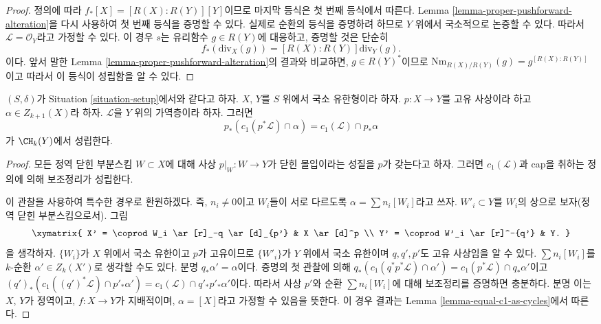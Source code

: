 \begin{proof}
정의에 따라 $f_*[X] = [R(X) : R(Y)][Y]$이므로 마지막 등식은 첫 번째
등식에서 따른다. Lemma \ref{lemma-proper-pushforward-alteration}을 다시
사용하여 첫 번째 등식을 증명할 수 있다. 실제로 순환의 등식을
증명하려 하므로 $Y$ 위에서 국소적으로 논증할 수 있다. 따라서
$\mathcal{L} = \mathcal{O}_Y$라고 가정할 수 있다. 이 경우 $s$는
유리함수 $g \in R(Y)$에 대응하고, 증명할 것은 단순히
$$
f_*\left(\text{div}_X(g)\right) =
[R(X) : R(Y)]\text{div}_Y(g).
$$
이다. 앞서 말한 Lemma \ref{lemma-proper-pushforward-alteration}의 결과와
비교하면, $g \in R(Y)^*$이므로
$\text{Nm}_{R(X)/R(Y)}(g) = g^{[R(X) : R(Y)]}$이고 따라서 이 등식이
성립함을 알 수 있다.
\end{proof}

\begin{lemma}
\label{lemma-pushforward-cap-c1}
$(S, \delta)$가 Situation \ref{situation-setup}에서와 같다고 하자.
$X$, $Y$를 $S$ 위에서 국소 유한형이라 하자. $p : X \to Y$를 고유
사상이라 하고 $\alpha \in Z_{k + 1}(X)$라 하자. $\mathcal{L}$을 $Y$ 위의
가역층이라 하자. 그러면
$$
p_*(c_1(p^*\mathcal{L}) \cap \alpha) = c_1(\mathcal{L}) \cap p_*\alpha
$$
가 $\CH_k(Y)$에서 성립한다.
\end{lemma}

\begin{proof}
모든 정역 닫힌 부분스킴 $W \subset X$에 대해 사상
$p|_W : W \to Y$가 닫힌 몰입이라는 성질을 $p$가 갖는다고 하자. 그러면
$c_1(\mathcal{L})$과 cap을 취하는 정의에 의해 보조정리가 성립한다.

\medskip\noindent
이 관찰을 사용하여 특수한 경우로 환원하겠다. 즉, $n_i \not = 0$이고
$W_i$들이 서로 다르도록 $\alpha = \sum n_i[W_i]$라고 쓰자.
$W'_i \subset Y$를 $W_i$의 상으로 보자(정역 닫힌 부분스킴으로서).
그림
$$
\xymatrix{
X' = \coprod W_i \ar[r]_-q \ar[d]_{p'} & X \ar[d]^p \\
Y' = \coprod W'_i \ar[r]^-{q'} & Y.
}
$$
을 생각하자. $\{W_i\}$가 $X$ 위에서 국소 유한이고 $p$가 고유이므로
$\{W'_i\}$가 $Y$ 위에서 국소 유한이며 $q, q', p'$도 고유 사상임을
알 수 있다. $\sum n_i[W_i]$를 $k$-순환
$\alpha' \in Z_k(X')$로 생각할 수도 있다. 분명
$q_*\alpha' = \alpha$이다. 증명의 첫 관찰에 의해
$q_*(c_1(q^*p^*\mathcal{L}) \cap \alpha')
= c_1(p^*\mathcal{L}) \cap q_*\alpha'$이고
$(q')_*(c_1((q')^*\mathcal{L}) \cap p'_*\alpha') =
c_1(\mathcal{L}) \cap q'_*p'_*\alpha'$이다. 따라서 사상 $p'$와 순환
$\sum n_i[W_i]$에 대해 보조정리를 증명하면 충분하다. 분명 이는
$X$, $Y$가 정역이고, $f : X \to Y$가 지배적이며, $\alpha = [X]$라고
가정할 수 있음을 뜻한다. 이 경우 결과는 Lemma
\ref{lemma-equal-c1-as-cycles}에서 따른다.
\end{proof}






